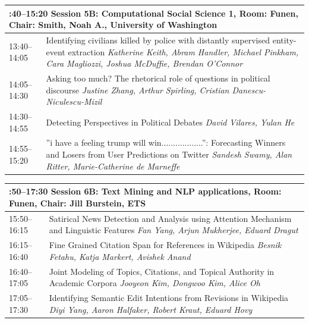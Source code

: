 \documentclass{book}
\renewcommand{\large}{\fontsize{72}{80}\selectfont}
\renewcommand{\large}{\fontsize{82}{90}\selectfont}
\begin{document}
\begin{tabular}{p{20cm}p{70cm}}
  \multicolumn{2}{p{\textwidth}}{\bfseries\large 13:40--15:20 Session 5B: Computational Social Science 1, Room:  Funen, Chair:  Smith, Noah A., University of Washington} \\\hline

    
    13:40--14:05
    &	Identifying civilians killed by police with distantly supervised entity-event extraction \newline 
    {\itshape Katherine Keith, Abram Handler, Michael Pinkham, Cara Magliozzi, Joshua McDuffie, Brendan O'Connor} \\
    
    14:05--14:30
    &	Asking too much? The rhetorical role of questions in political discourse \newline 
    {\itshape Justine Zhang, Arthur Spirling, Cristian Danescu-Niculescu-Mizil} \\
    
    14:30--14:55
    &	Detecting Perspectives in Political Debates \newline 
    {\itshape David Vilares, Yulan He} \\
    
    14:55--15:20
    &	''i have a feeling trump will win..................'': Forecasting Winners and Losers from User Predictions on Twitter \newline 
    {\itshape Sandesh Swamy, Alan Ritter, Marie-Catherine de Marneffe} \\
    
\end{tabular}
\vspace*{\fill}

\begin{tabular}{p{20cm}p{70cm}}
  \multicolumn{2}{p{\textwidth}}{\bfseries\large 15:50--17:30 Session 6B: Text Mining and NLP applications, Room:  Funen, Chair:  Jill Burstein, ETS} \\\hline

    
    15:50--16:15
    &	Satirical News Detection and Analysis using Attention Mechanism and Linguistic Features \newline 
    {\itshape Fan Yang, Arjun Mukherjee, Eduard Dragut} \\
    
    16:15--16:40
    &	Fine Grained Citation Span for References in Wikipedia \newline 
    {\itshape Besnik Fetahu, Katja Markert, Avishek Anand} \\
    
    16:40--17:05
    &	Joint Modeling of Topics, Citations, and Topical Authority in Academic Corpora \newline 
    {\itshape Jooyeon Kim, Dongwoo Kim, Alice Oh} \\
    
    17:05--17:30
    &	Identifying Semantic Edit Intentions from Revisions in Wikipedia \newline 
    {\itshape Diyi Yang, Aaron Halfaker, Robert Kraut, Eduard Hovy} \\
    
\end{tabular}
\vspace*{\fill}
\end{document}
